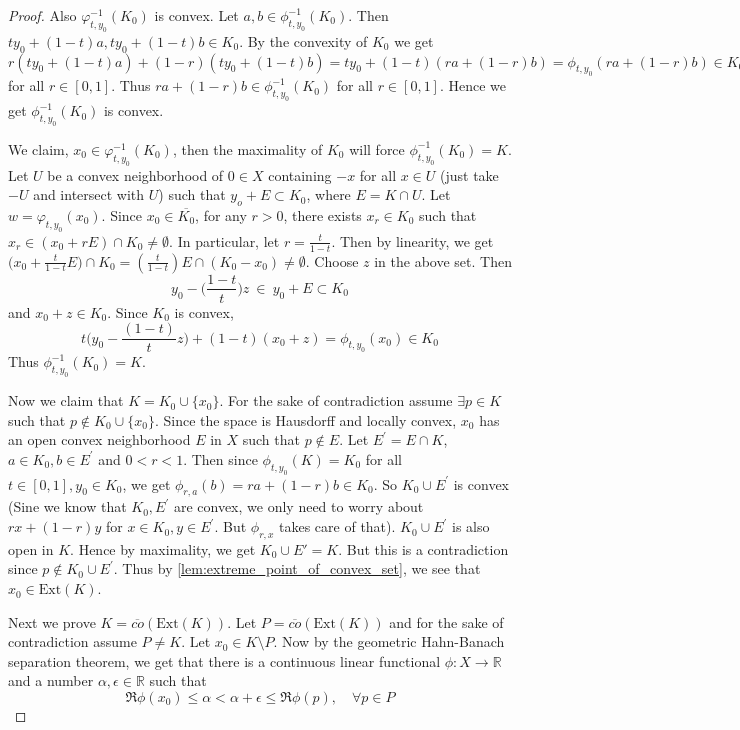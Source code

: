 \begin{proof}
  Also $\varphi_{t, y_0}^{-1}(K_0)$ is convex. Let $a, b \in
  \phi^{-1}_{t, y_0}(K_0)$. Then $ty_0 + (1-t)a, ty_0 + (1-t)b \in
  K_0$. By the convexity of $K_0$ we get $r(ty_0 + (1-t)a) +
  (1-r)(ty_0 + (1-t)b) = ty_0 + (1-t)(ra + (1-r)b) = \phi_{t, y_0}(ra
  + (1-r)b) \in K_0$ for all $r \in [0, 1]$. Thus $ra + (1-r)b \in
  \phi^{-1}_{t, y_0}(K_0)$ for all $r \in [0, 1]$. Hence we get
  $\phi^{-1}_{t, y_0}(K_0)$ is convex.

  We claim, $x_0 \in \varphi_{t, y_0}^{-1}(K_0)$, then the maximality
  of $K_0$ will force $\phi^{-1}_{t, y_0}(K_0) = K$.  Let $U$ be a
  convex neighborhood of $0 \in X$ containing $-x$ for all $x \in U$
  \marginnote{\scriptsize \textcolor{red}{I can't picturize the choice of $z$}}
  (just take $-U$ and intersect with $U$) such that $y_o + E
  \subset K_0$, where $E = K \cap U$. Let $w = \varphi_{t,
  y_0}(x_0)$. Since $x_0 \in
  \overline{K_0}$, for any $r>0$, there exists $x_r \in K_0$ such
  that $x_r \in (x_0 +
  rE) \cap K_0 \neq \emptyset$. In particular, let $r =
  \frac{t}{1-t}$. Then by linearity, we get $\big(x_0 +
  \frac{t}{1-t}E\big) \cap K_0 = ( \frac{t}{1-t}  )E\cap
  (K_0 - x_0) \neq \emptyset$. Choose $z$ in the above set. Then \[
    y_0 - \Big( \frac{1-t}{t} \Big)z \ \in \ y_0 + E \subset K_0
  \]
  and $x_0 + z \in K_0$. Since $K_0$ is convex, \[
    t\Big(y_0 - \frac{(1-t)}{t}z\Big) + (1-t)(x_0 + z)  = \phi_{t,
    y_0}(x_0) \in K_0
  \]
  Thus $\phi^{-1}_{t, y_0}(K_0) = K$.

  Now we claim that $K = K_0 \cup \{ x_0 \}$. For the sake of
  contradiction assume $\exists p \in K$ such that $p \notin K_0 \cup
  \{ x_0 \}$. Since the space is Hausdorff and locally convex, $x_0$ has an
  open convex neighborhood $E$ in $X$ such that $p \not\in E$. Let
  $E^\prime = E \cap K$, $a \in K_0, b \in E^\prime$ and $0 < r < 1$.
  Then since $\phi_{t, y_0}(K) = K_0$ for all $t \in [0, 1], y_0 \in K_0$, we
  get $\phi_{r, a}(b) = ra + (1-r)b \in K_0$. So $K_0 \cup
  E^\prime$ is convex (Sine we know that $K_0, E^\prime$ are convex,
    we only need to worry about $rx + (1-r)y$ for $x \in K_0, y \in
  E^\prime$. But $\phi_{r, x}$ takes care of that). $K_0 \cup
  E^\prime$ is also open in $K$. Hence by maximality, we get $K_0
  \cup E' = K$. But this is a contradiction since $ p \not\in K_0
  \cup E^\prime$. Thus by \autoref{lem:extreme_point_of_convex_set}, we see
  that $x_0 \in \textrm{Ext}(K)$.

  Next we prove $K = \overline{co}(\textrm{Ext}(K))$. Let $P =
  \overline{co}(\textrm{Ext}(K))$ and for the sake of contradiction
  assume $P \neq K$. Let $ x_0 \in K \setminus P$.
  Now by the geometric Hahn-Banach separation theorem, we get that
  there is a continuous linear functional
  $\phi: X \to \mathbb{R}$ and a number $\alpha, \epsilon \in
  \mathbb{R}$ such that \[
    \Re\phi(x_0) \le  \alpha < \alpha + \epsilon \le \Re\phi(p),
    \quad  \forall p \in P
  \]


\end{proof}
